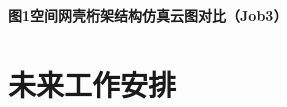 \documentclass[notheorems]{beamer}
\begin{document}
\begin{frame}
\begin{tcolorbox}
{				\centering
				{\fontsize{8}{11}\selectfont\sffamily\color{structure.fg!90}\bfseries
					图1\enspace 空间网壳桁架结构仿真云图对比（Job3）\par}
			}
			
			
		\end{tcolorbox}
		
	\end{frame}
	
	\section{未来工作安排}
	
	
\end{document}
